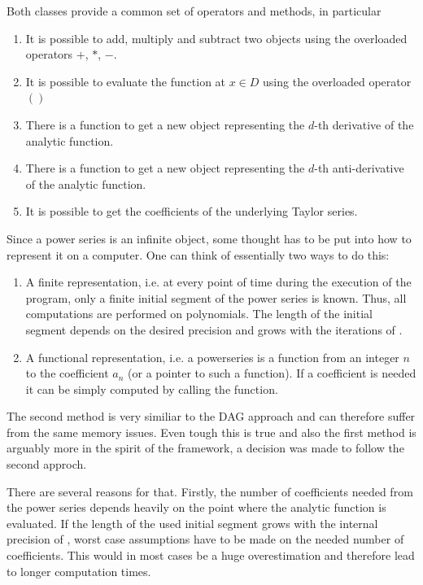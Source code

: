 		Both classes provide a common set of operators and methods, in particular
		\begin{enumerate}
			\item It is possible to add, multiply and subtract two objects using the overloaded operators $+$, $*$, $-$.
			\item It is possible to evaluate the function at $x \in D$ using the overloaded operator $()$
			\item There is a function  to get a new object representing the $d$-th derivative of the analytic function.
			\item There is a function  to get a new object representing the $d$-th anti-derivative of the analytic function.
			\item It is possible to get the coefficients of the underlying Taylor series.
		\end{enumerate}

    Since a power series is an infinite object, some thought has to be put into how to represent it on a computer.
    One can think of essentially two ways to do this:
		\begin{enumerate}
			\item A finite representation, i.e. at every point of time during the execution of the program, 
			only a finite initial segment of the power series is known. 
			Thus, all computations are performed on polynomials. 
			The length of the initial segment depends on the desired precision and grows 
			with the iterations of \irram.
			\item A functional representation, i.e. a powerseries is a function from an integer $n$ to the coefficient
			$a_n$ (or a pointer to such a function). If a coefficient is needed it can be simply computed by calling the function.
		\end{enumerate}
		
		The second method is very similiar to the DAG approach and can therefore suffer from the same memory issues.
		Even tough this is true and also the first method is arguably more in the spirit of the \irram framework, a decision was made to follow the second approch.

		There are several reasons for that. Firstly, the number of coefficients needed from the power series depends heavily on the point where the analytic function is evaluated. 
		If the length of the used initial segment grows with the internal precision of \irram, worst case assumptions have to be 
		made on the needed number of coefficients. 
		This would in most cases be a huge overestimation and therefore lead to longer computation times.

